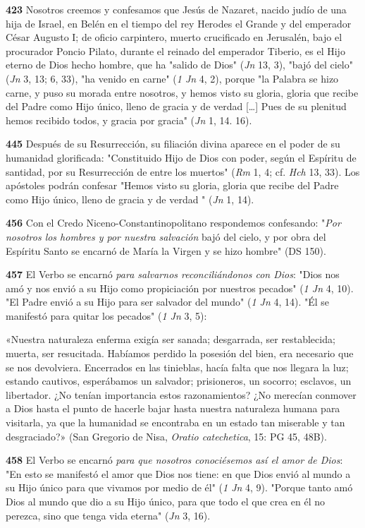 \documentclass[]{article}
\begin{document}
\textbf{423} Nosotros creemos y confesamos que Jesús de Nazaret, nacido
judío de una hija de Israel, en Belén en el tiempo del rey Herodes el
Grande y del emperador César Augusto I; de oficio carpintero, muerto
crucificado en Jerusalén, bajo el procurador Poncio Pilato, durante el
reinado del emperador Tiberio, es el Hijo eterno de Dios hecho hombre,
que ha "salido de Dios" (\emph{Jn} 13, 3), "bajó del cielo" (\emph{Jn}
3, 13; 6, 33), "ha venido en carne" (\emph{1 Jn} 4, 2), porque "la
Palabra se hizo carne, y puso su morada entre nosotros, y hemos visto su
gloria, gloria que recibe del Padre como Hijo único, lleno de gracia y
de verdad [\ldots{}] Pues de su plenitud hemos recibido todos, y gracia
por gracia" (\emph{Jn} 1, 14. 16).

\textbf{445} Después de su Resurrección, su filiación divina aparece en
el poder de su humanidad glorificada: "Constituido Hijo de Dios con
poder, según el Espíritu de santidad, por su Resurrección de entre los
muertos" (\emph{Rm} 1, 4; cf. \emph{Hch} 13, 33). Los apóstoles podrán
confesar "Hemos visto su gloria, gloria que recibe del Padre como Hijo
único, lleno de gracia y de verdad " (\emph{Jn} 1, 14).

\textbf{456} Con el Credo Niceno-Constantinopolitano respondemos
confesando: "\emph{Por nosotros los hombres y por nuestra salvación}
bajó del cielo, y por obra del Espíritu Santo se encarnó de María la
Virgen y se hizo hombre" (DS 150).

\textbf{457} El Verbo se encarnó \emph{para salvarnos reconciliándonos
con Dios}: "Dios nos amó y nos envió a su Hijo como propiciación por
nuestros pecados" (\emph{1 Jn} 4, 10). "El Padre envió a su Hijo para
ser salvador del mundo" (\emph{1 Jn} 4, 14). "Él se manifestó para
quitar los pecados" (\emph{1 Jn} 3, 5):

«Nuestra naturaleza enferma exigía ser sanada; desgarrada, ser
restablecida; muerta, ser resucitada. Habíamos perdido la posesión del
bien, era necesario que se nos devolviera. Encerrados en las tinieblas,
hacía falta que nos llegara la luz; estando cautivos, esperábamos un
salvador; prisioneros, un socorro; esclavos, un libertador. ¿No tenían
importancia estos razonamientos? ¿No merecían conmover a Dios hasta el
punto de hacerle bajar hasta nuestra naturaleza humana para visitarla,
ya que la humanidad se encontraba en un estado tan miserable y tan
desgraciado?» (San Gregorio de Nisa, \emph{Oratio catechetica}, 15: PG
45, 48B).

\textbf{458} El Verbo se encarnó \emph{para que nosotros conociésemos
así el amor de Dios}: "En esto se manifestó el amor que Dios nos tiene:
en que Dios envió al mundo a su Hijo único para que vivamos por medio de
él" (\emph{1 Jn} 4, 9). "Porque tanto amó Dios al mundo que dio a su
Hijo único, para que todo el que crea en él no perezca, sino que tenga
vida eterna" (\emph{Jn} 3, 16).
\end{document}
